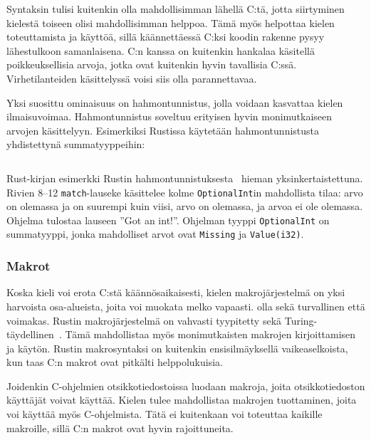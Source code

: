 \FloatBarrier

Syntaksin tulisi kuitenkin olla mahdollisimman lähellä C:tä, jotta siirtyminen
kielestä toiseen olisi mahdollisimman helppoa. Tämä myös helpottaa kielen
toteuttamista ja käyttöä, sillä käännettäessä C:ksi koodin rakenne pysyy
lähestulkoon samanlaisena. C:n kanssa on kuitenkin hankalaa käsitellä
poikkeuksellisia arvoja, jotka ovat kuitenkin hyvin tavallisia C:ssä.
Virhetilanteiden käsittelyssä voisi siis olla parannettavaa.

\newpage
Yksi suosittu ominaisuus on hahmontunnistus, jolla
voidaan kasvattaa kielen ilmaisuvoimaa. Hahmontunnistus soveltuu erityisen
hyvin monimutkaiseen arvojen käsittelyyn. Esimerkiksi Rustissa käytetään
hahmontunnistusta yhdistettynä summatyyppeihin:

\FloatBarrier

\begin{listing}[ht!]
    \inputminted{Rust}{guards.rs}
    \caption{Rust-kirjan esimerkki Rustin
    hahmontunnistuksesta~\citep{rustguards} hieman yksinkertaistettuna. Rivien
    8--12 \texttt{match}-lauseke käsittelee kolme \texttt{OptionalInt}in
    mahdollista tilaa: arvo on olemassa ja on suurempi kuin viisi, arvo on
    olemassa, ja arvoa ei ole olemassa. Ohjelma tulostaa lauseen ''Got an
    int!''. Ohjelman tyyppi \texttt{OptionalInt} on summatyyppi, jonka
    mahdolliset arvot ovat \texttt{Missing} ja \texttt{Value(i32)}.}
    \label{fig:guards}
\end{listing}

\FloatBarrier

\subsubsection{Makrot}

Koska kieli voi erota C:stä käännösaikaisesti, kielen makrojärjestelmä on yksi
harvoista osa-alueista, joita voi muokata melko vapaasti. olla sekä turvallinen
että voimakas. Rustin makrojärjestelmä on vahvasti tyypitetty sekä
Turing-täydellinen~\citep{rustmacros}. Tämä mahdollistaa myös monimutkaisten
makrojen kirjoittamisen ja käytön. Rustin makrosyntaksi on kuitenkin
ensisilmäyksellä vaikeaselkoista, kun taas C:n makrot ovat pitkälti
helppolukuisia.

Joidenkin C-ohjelmien otsikkotiedostoissa luodaan makroja, joita
otsikkotiedoston käyttäjät voivat käyttää. Kielen tulee mahdollistaa makrojen
tuottaminen, joita voi käyttää myös C-ohjelmista. Tätä ei kuitenkaan voi
toteuttaa kaikille makroille, sillä C:n makrot ovat hyvin rajoittuneita.

